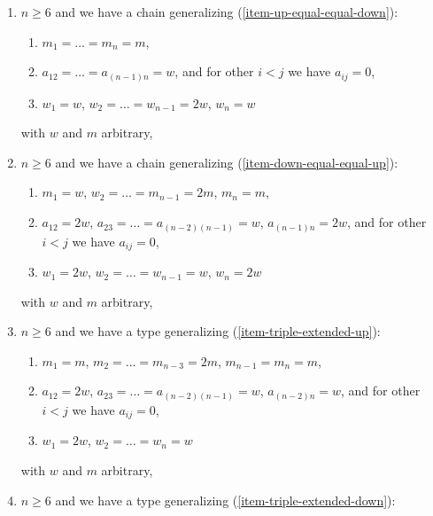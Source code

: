 \begin{lemma}
\begin{enumerate}
\begin{enumerate}
\item $m_1 = \ldots = m_{n - 1} = 2m$, $m_n = m$,
\item $a_{12} = \ldots = a_{(n - 2) (n - 1)} = 2w$, $a_{(n - 1) n} = 4w$,
and for other $i < j$ we have $a_{ij} = 0$,
\item $w_1 = w$, $w_2 = \ldots = w_{n - 1} = 2w$, $w_n = 4w$
\end{enumerate}
with $w$ and $m$ arbitrary,
\item
\label{models-item-up-chain-equal-down}
$n \geq 6$ and we have a chain generalizing (\ref{item-up-equal-equal-down}):
\begin{enumerate}
\item $m_1 = \ldots = m_n = m$,
\item $a_{12} = \ldots = a_{(n - 1) n} = w$,
and for other $i < j$ we have $a_{ij} = 0$,
\item $w_1 = w$, $w_2 = \ldots = w_{n - 1} = 2w$, $w_n = w$
\end{enumerate}
with $w$ and $m$ arbitrary,
\item
\label{models-item-down-chain-equal-up}
$n \geq 6$ and we have a chain generalizing (\ref{item-down-equal-equal-up}):
\begin{enumerate}
\item $m_1 = w$, $w_2 = \ldots = m_{n - 1} = 2m$, $m_n = m$,
\item $a_{12} = 2w$, $a_{23} = \ldots = a_{(n - 2) (n - 1)} = w$,
$a_{(n - 1) n} = 2w$, and for other $i < j$ we have $a_{ij} = 0$,
\item $w_1 = 2w$, $w_2 = \ldots = w_{n - 1} = w$, $w_n = 2w$
\end{enumerate}
with $w$ and $m$ arbitrary,
\item
\label{models-item-Dn-extended-up}
$n \geq 6$ and we have a type generalizing (\ref{item-triple-extended-up}):
\begin{enumerate}
\item $m_1 = m$, $m_2 = \ldots = m_{n - 3} = 2m$, $m_{n - 1} = m_n = m$,
\item $a_{12} = 2w$, $a_{23} = \ldots = a_{(n - 2) (n - 1)} = w$,
$a_{(n - 2) n} = w$, and for other $i < j$ we have $a_{ij} = 0$,
\item $w_1 = 2w$, $w_2 = \ldots = w_n = w$
\end{enumerate}
with $w$ and $m$ arbitrary,
\item
\label{models-item-Dn-extended-down}
$n \geq 6$ and we have a type generalizing (\ref{item-triple-extended-down}):
\begin{enumerate}

\end{enumerate}
\end{enumerate}
\end{lemma}
